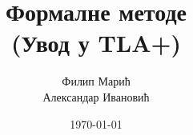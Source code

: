 \documentclass[12pt, a4paper]{article}
\title{\textbf{Формалне методе} \\ (Увод у TLA+)}
\author{Филип Марић \\ Александар Ивановић}
\date{\today}
\theoremstyle{plain}
\theoremstyle{definition}
\theoremstyle{remark}
\begin{document}
\maketitle
\newpage
\tableofcontents
\newpage





\newpage

\newpage

\newpage


\newpage
\nocite{lamportLearningTLA,learnTLAIndex}


\end{document}
